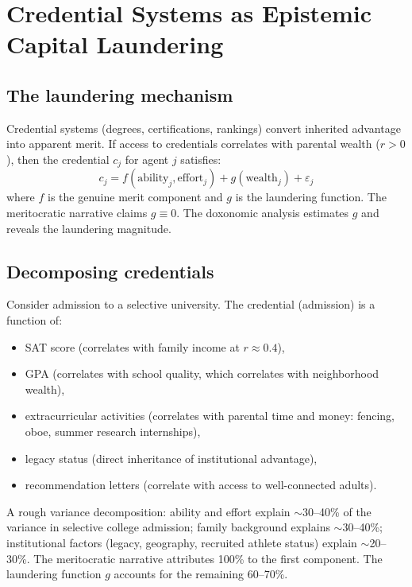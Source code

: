 \section{Credential Systems as Epistemic Capital Laundering}
\label{sec:ch22-credentials}

\subsection{The laundering mechanism}

\begin{proposition}
\label{prop:credential}
Credential systems (degrees, certifications, rankings) convert inherited advantage into apparent merit.
If access to credentials correlates with parental wealth ($r > 0$), then the credential $c_j$ for agent $j$ satisfies:
\[
  c_j = f(\text{ability}_j, \text{effort}_j) + g(\text{wealth}_j) + \varepsilon_j
\]
where $f$ is the genuine merit component and $g$ is the laundering function.
The meritocratic narrative claims $g \equiv 0$.
The doxonomic analysis estimates $g$ and reveals the laundering magnitude.
\end{proposition}

\subsection{Decomposing credentials}

\begin{example}
\label{ex:credential-decomposition}
Consider admission to a selective university.
The credential (admission) is a function of:
\begin{itemize}[nosep]
  \item SAT score (correlates with family income at $r \approx 0.4$),
  \item GPA (correlates with school quality, which correlates with neighborhood wealth),
  \item extracurricular activities (correlates with parental time and money: fencing, oboe, summer research internships),
  \item legacy status (direct inheritance of institutional advantage),
  \item recommendation letters (correlate with access to well-connected adults).
\end{itemize}

A rough variance decomposition: ability and effort explain $\sim$30--40\% of the variance in selective college admission; family background explains $\sim$30--40\%; institutional factors (legacy, geography, recruited athlete status) explain $\sim$20--30\%.
The meritocratic narrative attributes 100\% to the first component.
The laundering function $g$ accounts for the remaining 60--70\%.
\end{example}


